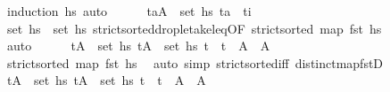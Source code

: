 \begin{isabellebody}
\ {\isacharparenleft}{\kern0pt}induction\ hs{\isacharparenright}{\kern0pt}\ auto\isanewline
\ \ \ \ \isamarkupfalse%
\ {\isachardoublequoteopen}{\isasymforall}{\isacharparenleft}{\kern0pt}t\isactrlsub a{\isacharcomma}{\kern0pt}A{\isacharparenright}{\kern0pt}\ {\isasymin}\ set\ {\isacharquery}{\kern0pt}hs{\isacharprime}{\kern0pt}{\isachardot}{\kern0pt}\ t\isactrlsub a\ {\isacharequal}{\kern0pt}\ t\isactrlsub i{\isachardoublequoteclose}\isanewline
\ \ \ \ \ \ \isamarkupfalse%
\ {\isacartoucheopen}set\ {\isacharquery}{\kern0pt}hs{\isacharprime}{\kern0pt}\ {\isasymsubseteq}\ set\ hs{\isacartoucheclose}\ strict{\isacharunderscore}{\kern0pt}sorted{\isacharunderscore}{\kern0pt}drop{\isacharunderscore}{\kern0pt}le{\isacharunderscore}{\kern0pt}take{\isacharunderscore}{\kern0pt}leq{\isacharbrackleft}{\kern0pt}OF\ {\isacartoucheopen}strict{\isacharunderscore}{\kern0pt}sorted\ {\isacharparenleft}{\kern0pt}map\ fst\ hs{\isacharparenright}{\kern0pt}{\isacartoucheclose}{\isacharbrackright}{\kern0pt}\isanewline
\ \ \ \ \ \ \isamarkupfalse%
\ auto\isanewline
\ \ \ \ \isamarkupfalse%
\ {\isachardoublequoteopen}{\isasymforall}{\isacharparenleft}{\kern0pt}tA\ {\isasymin}\ set\ hs{\isachardot}{\kern0pt}\ {\isasymforall}{\isacharparenleft}{\kern0pt}tA\ {\isasymin}\ set\ hs{\isachardot}{\kern0pt}\ t\ {\isacharequal}{\kern0pt}\ t\ {\isasymlongrightarrow}\ A\ {\isacharequal}{\kern0pt}\ A\isanewline
\ \ \ \ \ \ \isamarkupfalse%
\ {\isacartoucheopen}strict{\isacharunderscore}{\kern0pt}sorted\ {\isacharparenleft}{\kern0pt}map\ fst\ hs{\isacharparenright}{\kern0pt}{\isacartoucheclose}\ \isamarkupfalse%
\ {\isacharparenleft}{\kern0pt}auto\ simp{\isacharcolon}{\kern0pt}\ strict{\isacharunderscore}{\kern0pt}sorted{\isacharunderscore}{\kern0pt}iff\ distinct{\isacharunderscore}{\kern0pt}map{\isacharunderscore}{\kern0pt}fstD{\isacharparenright}{\kern0pt}\isanewline
\ \ \ \ \isamarkupfalse%
\ \isamarkupfalse%
\ {\isachardoublequoteopen}{\isasymforall}{\isacharparenleft}{\kern0pt}tA\ {\isasymin}\ set\ {\isacharquery}{\kern0pt}hs{\isacharprime}{\kern0pt}{\isachardot}{\kern0pt}\ {\isasymforall}{\isacharparenleft}{\kern0pt}tA\ {\isasymin}\ set\ {\isacharquery}{\kern0pt}hs{\isacharprime}{\kern0pt}{\isachardot}{\kern0pt}\ t\ {\isacharequal}{\kern0pt}\ t\ {\isasymlongrightarrow}\ A\ {\isacharequal}{\kern0pt}\ A\isanewline

\end{isabellebody}
